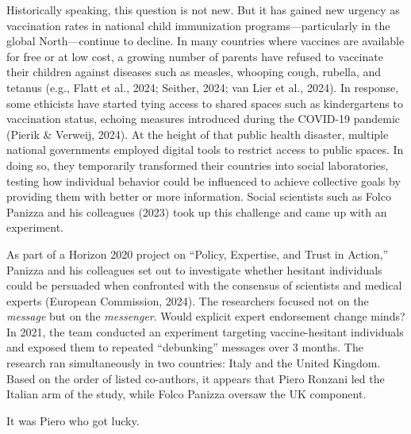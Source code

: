 \documentclass[authordate, reflection]{jote-new-article}
\begin{document}
	Historically speaking, this question is not new. But it has gained new urgency as vaccination rates in national child immunization programs—particularly in the global North—continue to decline. In many countries where vaccines are available for free or at low cost, a growing number of parents have refused to vaccinate their children against diseases such as measles, whooping cough, rubella, and tetanus (e.g., Flatt et al., 2024; Seither, 2024; van Lier et al., 2024). In response, some ethicists have started tying access to shared spaces such as kindergartens to vaccination status, echoing measures introduced during the COVID-19 pandemic (Pierik \& Verweij, 2024). At the height of that public health disaster, multiple national governments employed digital tools to restrict access to public spaces. In doing so, they temporarily transformed their countries into social laboratories, testing how individual behavior could be influenced to achieve collective goals by providing them with better or more information. Social scientists such as Folco Panizza and his colleagues (2023) took up this challenge and came up with an experiment.







	As part of a Horizon 2020 project on “Policy, Expertise, and Trust in Action,” Panizza and his colleagues set out to investigate whether hesitant individuals could be persuaded when confronted with the consensus of scientists and medical experts (European Commission, 2024). The researchers focused not on the \emph{message} but on the \emph{messenger}. Would explicit expert endorsement change minds? In 2021, the team conducted an experiment targeting vaccine-hesitant individuals and exposed them to repeated “debunking” messages over 3 months. The research ran simultaneously in two countries: Italy and the United Kingdom. Based on the order of listed co-authors, it appears that Piero Ronzani led the Italian arm of the study, while Folco Panizza oversaw the UK component.





\vspace{\baselineskip}

	\noindent It was Piero who got lucky.


	\vspace{\baselineskip}
\end{document}
